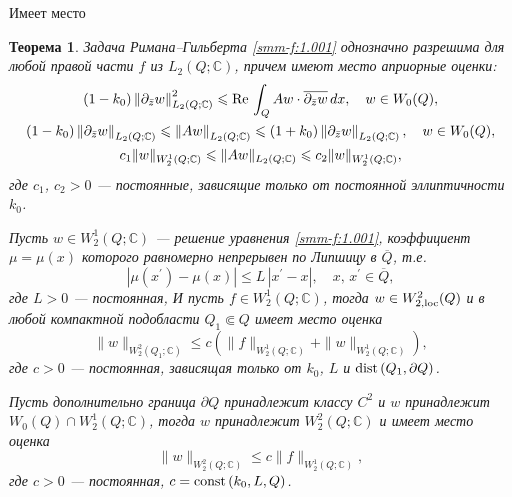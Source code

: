 \documentclass[a4paper,12pt]{article}
\newtheorem{theorem}{Теорема}[section]
\theoremstyle{definition}
\begin{document}
Имеет место

\begin{theorem}\label{smm-th1.1}
Задача Римана--Гильберта { \eqref{smm-f:1.001}} однозначно разрешима для любой правой части $f$ из $L_2(Q;\mathbb{C})$,
причем имеют место априорные оценки:
\begin{gather*}
(1-k_0)\left\|\partial_{\bar{z}}w\right\|^2_{L_2(Q;\mathbb{C})}\leqslant \text{\rm Re\,} \int_{Q} Aw\cdot \overline{\partial_{\bar{z}}w}\,dx,\quad w\in W_0(Q),\\
(1-k_0)\left\|\partial_{\bar{z}}w\right\|_{L_2(Q;\mathbb{C})}\leqslant \left\| Aw\right\|_{L_2(Q;\mathbb{C})} \leqslant
(1+k_0)\left\|\partial_{\bar{z}}w\right\|_{L_2(Q;\mathbb{C})}, \quad w\in W_0(Q),\\
	c_1\|w\|_{W^1_2(Q;\mathbb{C})}\leqslant\|Aw\|_{L_2(Q;\mathbb{C})}\leqslant c_2 \|w\|_{W^1_2(Q;\mathbb{C})},
\end{gather*}
где $c_1$, $c_2>0$ --- постоянные, зависящие только от постоянной эллиптичности $k_0$.


\hspace{5.mm} Пусть $w\in W_2^1(Q;\mathbb{C})$ --- решение уравнения  {\rm \eqref{smm-f:1.001}}, коэффициент $\mu=\mu(x)$ которого равномерно непрерывен по Липшицу в $\overline Q$, т.е.
$$
|\mu(x^\prime)-\mu(x)|\leqslant L\,|x^\prime-x|,\quad x,\,x^\prime\in \overline{Q},
$$
где $L>0$ --- постоянная, И пусть  $f\in W_2^1(Q;\mathbb{C})$, тогда $w\in W_{2,\text{\rm loc}}^2(Q)$ и в любой компактной подобласти $Q_1\Subset Q$ имеет место оценка
\begin{equation*}
	\|w\|_{W^2_2(Q_1; \mathbb{C})}\leqslant c\left(\|f\|_{W^1_2(Q; \mathbb{C})}+\|w\|_{W^1_2(Q; \mathbb{C})}\right),
\end{equation*}
где $c>0$ --- постоянная, зависящая только от $k_0$, $L$ и $\text{\rm dist\,}(Q_1,\partial Q)$.

\hspace{5.mm} Пусть дополнительно граница $\partial Q$ принадлежит классу $C^2$ и $w$ принадлежит $W_0(Q)\cap W_2^1(Q; \mathbb{C})$, тогда $w$ принадлежит $W_2^2(Q; \mathbb{C})$ и имеет место оценка
\begin{equation*}
\|w\|_{W^2_2(Q; \mathbb{C})}\leqslant c\|f\|_{W^1_2(Q; \mathbb{C})},
\end{equation*}
где $c>0$ --- постоянная, $c=\text{\rm const\,}(k_0, L, Q)$.
\end{theorem}




\smallskip
\end{document}
